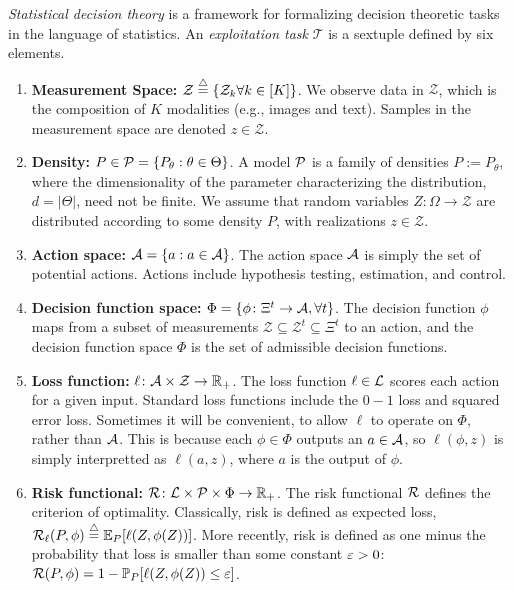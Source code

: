\documentclass{article}
\begin{document}
\emph{Statistical decision theory} is a framework for formalizing decision theoretic tasks in the language of statistics.  An \emph{exploitation task} $\mathcal{T}$ is a sextuple defined by six elements.
\begin{enumerate}
  \item \textbf{Measurement Space:} $\mathcal{Z} \overset{\triangle}{=} \{ \mathcal{Z}_k \forall k \in [K]\}$. We observe data in $\mathcal{Z}$, which is the composition of  $K$ modalities (e.g., images and text).  Samples in the measurement space are denoted  $z \in \mathcal{Z}$.  
	\item \textbf{Density:} $P \in \mathcal{P}=\{P_{\theta}: \theta \in \Theta\}$.  A model $\mathcal{P}$ is a family of densities $P := P_{\theta}$, where the dimensionality of the parameter characterizing the distribution, $d=|\Theta|$, need not be finite.     We assume that random variables $Z \colon \Omega \to \mathcal{Z}$  are distributed according to some density $P$, with realizations $z \in \mathcal{Z}$.
	\item \textbf{Action space:} $\mathcal{A}=\{a : a \in \mathcal{A}\}$.  The action space $\mathcal{A}$ is simply the set of potential actions.  Actions  include hypothesis testing, estimation, and control. 
	\item \textbf{Decision function space:} $\Phi = \{\phi \colon \Xi^t \to \mathcal{A}, \forall t \}$. The decision function $\phi$ maps from a subset of measurements $\mathcal{Z} \subseteq \mathcal{Z}^t \subseteq \Xi^t$ to an action, and the decision function space $\Phi$ is the set of admissible decision functions.
	\item \textbf{Loss function:} $\ell \colon \mathcal{A} \times \mathcal{Z} \to \mathbb{R}_+$.  The loss function $\ell \in \mathcal{L}$ scores each action for a given input.  Standard loss functions include the $0-1$ loss and squared error loss. Sometimes it will be convenient,  to allow $\ell$ to operate on $\Phi$, rather than $\mathcal{A}$. This is because each $\phi \in \Phi$ outputs an $a \in \mathcal{A}$, so $\ell(\phi,z)$ is simply interpretted as $\ell(a,z)$, where $a$ is the output of $\phi$.
    \item \textbf{Risk functional:} $\mathcal{R} \colon \mathcal{L} \times \mathcal{P} \times \Phi \to \mathbb{R}_+$.	The risk functional $\mathcal{R}$ defines the criterion of optimality.  Classically, risk is defined as expected loss, $\mathcal{R}_\ell(P,\phi) \overset{\triangle}{=} \mathbb{E}_P[\ell(Z,\phi(Z))]$. More recently, risk is defined as one minus the probability that loss is smaller than some constant $\varepsilon>0$: $\mathcal{R}(P,\phi)= 1-\mathbb{P}_P[ \ell(Z,\phi(Z)) \leq \varepsilon]$. 
\end{enumerate}
\end{document}
